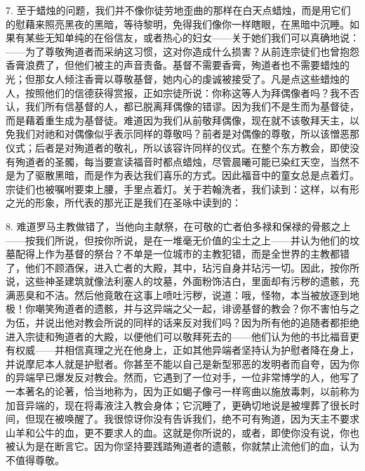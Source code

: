 7. 至于蜡烛的问题，我们并不像你徒劳地歪曲的那样在白天点蜡烛，而是用它们的慰藉来照亮黑夜的黑暗，等待黎明，免得我们像你一样瞎眼，在黑暗中沉睡。如果有某些无知单纯的在俗信友，或者热心的妇女——关于她们我们可以真确地说：——为了尊敬殉道者而采纳这习惯，这对你造成什么损害？从前连宗徒们也曾抱怨香膏浪费了，但他们被主的声音责备。基督不需要香膏，殉道者也不需要蜡烛的光；但那女人倾注香膏以尊敬基督，她内心的虔诚被接受了。凡是点这些蜡烛的人，按照他们的信德获得赏报，正如宗徒所说：你称这等人为拜偶像者吗？我不否认，我们所有信基督的人，都已脱离拜偶像的错谬。因为我们不是生而为基督徒，而是藉着重生成为基督徒。难道因为我们从前敬拜偶像，现在就不该敬拜天主，以免我们对祂和对偶像似乎表示同样的尊敬吗？前者是对偶像的尊敬，所以该憎恶那仪式；后者是对殉道者的敬礼，所以该容许同样的仪式。在整个东方教会，即使没有殉道者的圣髑，每当要宣读福音时都点蜡烛，尽管晨曦可能已染红天空，当然不是为了驱散黑暗，而是作为表达我们喜乐的方式。因此福音中的童女总是点着灯。宗徒们也被嘱咐要束上腰，手里点着灯。关于若翰洗者，我们读到：这样，以有形之光的形象，所代表的那光正是我们在圣咏中读到的：\par

8. 难道罗马主教做错了，当他向主献祭，在可敬的亡者伯多禄和保禄的骨骸之上——按我们所说，但按你所说，是在一堆毫无价值的尘土之上——并认为他们的坟墓配得上作为基督的祭台？不单是一位城市的主教犯错，而是全世界的主教都错了，他们不顾酒保，进入亡者的大殿，其中，玷污自身并玷污一切。因此，按你所说，这些神圣建筑就像法利塞人的坟墓，外面粉饰洁白，里面却有污秽的遗骸，充满恶臭和不洁。然后他竟敢在这事上喷吐污秽，说道：哦，怪物，本当被放逐到地极！你嘲笑殉道者的遗骸，并与这异端之父一起，诽谤基督的教会？你不害怕与之为伍，并说出他对教会所说的同样的话来反对我们吗？因为所有他的追随者都拒绝进入宗徒和殉道者的大殿，以便他们可以敬拜死去的——他们认为他的书比福音更有权威——并相信真理之光在他身上，正如其他异端者坚持认为护慰者降在身上，并说摩尼本人就是护慰者。你甚至不能以自己是新型邪恶的发明者而自夸，因为你的异端早已爆发反对教会。然而，它遇到了一位对手，一位非常博学的人，他写了一本著名的论著，恰当地称为，因为正如蝎子像弓一样弯曲以施放毒刺，以前称为加音异端的，现在将毒液注入教会身体；它沉睡了，更确切地说是被埋葬了很长时间，但现在被唤醒了。我很惊讶你没有告诉我们，绝不可有殉道，因为天主不要求山羊和公牛的血，更不要求人的血。这就是你所说的，或者，即使你没有说，你也被认为是在断言它。因为你坚持要践踏殉道者的遗骸，你就禁止流他们的血，认为不值得尊敬。\par

